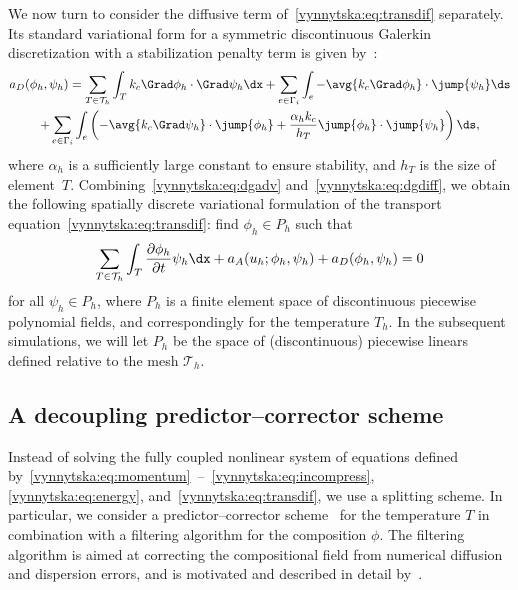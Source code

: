 We now turn to consider the diffusive term
of~\eqref{vynnytska:eq:transdif} separately. Its standard variational form
for a symmetric discontinuous Galerkin discretization with a stabilization
penalty term is given by~\citep{Arnold1982}:
\begin{multline}
  \label{vynnytska:eq:dgdiff}
    a_D(\phi_h, \psi_h)
    =
    \sum_{T \in \mathcal{T}_h} \int_T k_c \Grad \phi_h \cdot \Grad \psi_h \dx
    + \sum_{e \in \Gamma_i }
    \int_{e} - \avg{k_c \Grad \phi_h} \cdot \jump{\psi_h} \ds
\\
    + \sum_{e \in \Gamma_i} \int_{e} \left(
    - \avg{ k_c \Grad \psi_h} \cdot \jump{\phi_h}
    + \frac{\alpha_h k_c}{h_T} \jump{\phi_h} \cdot \jump{\psi_h}
    \right) \ds,
\end{multline}
where $\alpha_h$ is a sufficiently large constant to ensure stability, and
$h_T$ is the size of element~$T$. Combining~\eqref{vynnytska:eq:dgadv}
and~\eqref{vynnytska:eq:dgdiff}, we obtain the following
spatially discrete variational formulation of the transport
equation~\eqref{vynnytska:eq:transdif}: find $\phi_h \in P_h$ such that
\begin{equation}
  \label{vynnytska:eq:semi_composition}
  \sum_{T \in \mathcal{T}_h} \int_T \frac{\partial \phi_h}{\partial t}\psi_h \dx
  + a_{A} (u_h; \phi_h, \psi_h) + a_D(\phi_h, \psi_h) = 0
\end{equation}
for all $\psi_h \in P_h$, where $P_h$ is a finite element space of
discontinuous piecewise polynomial fields, and correspondingly for the
temperature $T_h$. In the subsequent simulations, we will let $P_h$ be
the space of (discontinuous) piecewise linears defined relative to the
mesh $\mathcal{T}_h$.

\subsection{A decoupling predictor--corrector scheme}


Instead of solving the fully coupled nonlinear system of equations
defined
by~\eqref{vynnytska:eq:momentum}~--~\eqref{vynnytska:eq:incompress},
\eqref{vynnytska:eq:energy}, and~\eqref{vynnytska:eq:transdif}, we
use a splitting scheme. In particular, we consider a
predictor--corrector scheme~\citep{BergKekenYuen1993, HansenEbel1988}
for the temperature $T$ in combination with a filtering algorithm for
the composition $\phi$. The filtering algorithm is aimed at correcting
the compositional field from numerical diffusion and dispersion
errors, and is motivated and described in detail
by~\citet{LenardicKaula1993}.

